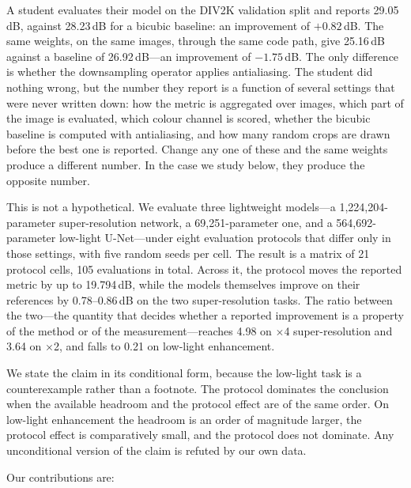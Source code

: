 \documentclass[10pt,twocolumn]{article}
\begin{document}
A student evaluates their model on the DIV2K validation split and reports
29.05\,dB, against 28.23\,dB for a bicubic baseline: an improvement of
$+0.82$\,dB. The same weights, on the same images, through the same code
path, give 25.16\,dB against a baseline of 26.92\,dB---an improvement of
$-1.75$\,dB. The only difference is whether the downsampling operator
applies antialiasing. The student did nothing wrong, but the number they
report is a function of several settings that were never written down: how
the metric is aggregated over images, which part of the image is evaluated,
which colour channel is scored, whether the bicubic baseline is computed
with antialiasing, and how many random crops are drawn before the best one
is reported. Change any one of these and the same weights produce a
different number. In the case we study below, they produce the opposite
number.

This is not a hypothetical. We evaluate three lightweight models---a
1,224,204-parameter super-resolution network, a 69,251-parameter one, and a
564,692-parameter low-light U-Net---under eight evaluation protocols that
differ only in those settings, with five random seeds per cell. The result
is a matrix of 21 protocol cells, 105 evaluations in total. Across it, the
protocol moves the reported metric by up to 19.794\,dB, while the models
themselves improve on their references by 0.78--0.86\,dB on the two
super-resolution tasks. The ratio between the two---the quantity that decides
whether a reported improvement is a property of the method or of the
measurement---reaches 4.98 on $\times$4 super-resolution and 3.64 on
$\times$2, and falls to 0.21 on low-light enhancement.

We state the claim in its conditional form, because the low-light task is a
counterexample rather than a footnote. The protocol dominates the conclusion
when the available headroom and the protocol effect are of the same order.
On low-light enhancement the headroom is an order of magnitude larger, the
protocol effect is comparatively small, and the protocol does not dominate.
Any unconditional version of the claim is refuted by our own data.

Our contributions are:
\end{document}
